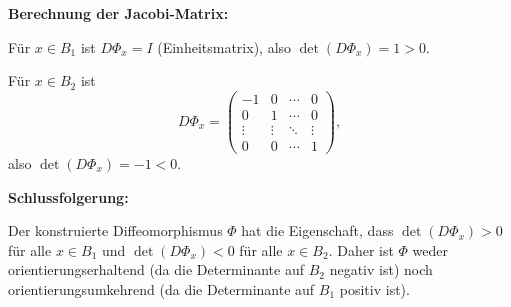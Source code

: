 \documentclass{article}
\begin{document}
\textbf{Berechnung der Jacobi-Matrix:}

Für $x \in B_1$ ist $D\Phi_x = I$ (Einheitsmatrix), also $\det(D\Phi_x) = 1 > 0$.

Für $x \in B_2$ ist 
\[
D\Phi_x = \begin{pmatrix}
    -1 & 0 & \cdots & 0 \\
    0 & 1 & \cdots & 0 \\
    \vdots & \vdots & \ddots & \vdots \\
    0 & 0 & \cdots & 1
\end{pmatrix},
\]
also $\det(D\Phi_x) = -1 < 0$.

\textbf{Schlussfolgerung:}

Der konstruierte Diffeomorphismus $\Phi$ hat die Eigenschaft, dass $\det(D\Phi_x) > 0$ für alle $x \in B_1$ und $\det(D\Phi_x) < 0$ für alle $x \in B_2$. Daher ist $\Phi$ weder orientierungserhaltend (da die Determinante auf $B_2$ negativ ist) noch orientierungsumkehrend (da die Determinante auf $B_1$ positiv ist).
\end{document}
